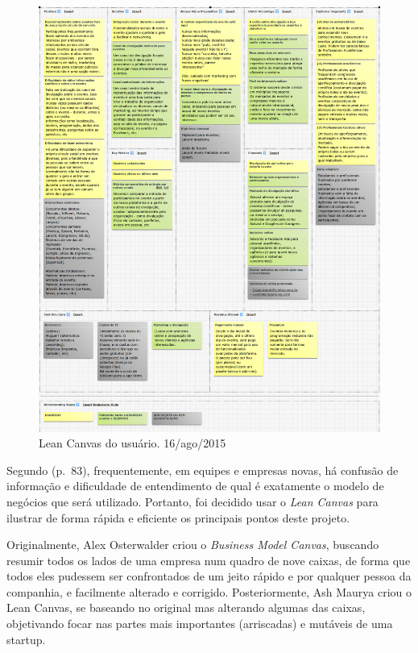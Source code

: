 \documentclass[12pt,a4paper,twoside,hyphens,english,brazil]{abntex2}
\begin{document}
\begin{figure}[!bp]
	\centering
	\includegraphics[width=1\linewidth]{imagens/canvas-usuarios.png}
	\caption{Lean Canvas do usuário. 16/ago/2015}
\end{figure}

Segundo \citeauthor{manual-startup} (p.~83), frequentemente, em equipes e empresas novas, há confusão de informação e dificuldade de entendimento de qual é exatamente o modelo de negócios que será utilizado. Portanto, foi decidido usar o \emph{Lean Canvas} para ilustrar de forma rápida e eficiente os principais pontos deste projeto.

Originalmente, Alex Osterwalder criou o \emph{Business Model Canvas}, buscando resumir todos os lados de uma empresa num quadro de nove caixas, de forma que todos eles pudessem ser confrontados de um jeito rápido e por qualquer pessoa da companhia, e facilmente alterado e  corrigido. Posteriormente, Ash Maurya criou o Lean Canvas, se baseando no original mas alterando algumas das caixas, objetivando focar nas partes mais importantes (arriscadas) e mutáveis de uma startup.\cite{why-lean-canvas}
\end{document}
